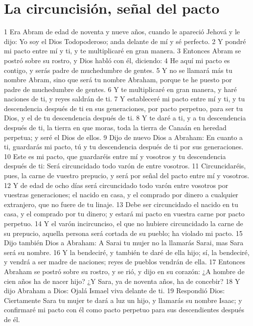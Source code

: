 \section*{La circuncisión, señal del pacto}

1 Era Abram de edad de noventa y nueve años, cuando le apareció Jehová y le dijo: Yo soy el Dios Todopoderoso; anda delante de mí y sé perfecto.
2 Y pondré mi pacto entre mí y ti, y te multiplicaré en gran manera.
3 Entonces Abram se postró sobre su rostro, y Dios habló con él, diciendo:
4 He aquí mi pacto es contigo, y serás padre de muchedumbre de gentes.
5 Y no se llamará más tu nombre Abram, sino que será tu nombre Abraham, porque te he puesto por padre de muchedumbre de gentes.
6 Y te multiplicaré en gran manera, y haré naciones de ti, y reyes saldrán de ti.
7 Y estableceré mi pacto entre mí y ti, y tu descendencia después de ti en sus generaciones, por pacto perpetuo, para ser tu Dios, y el de tu descendencia después de ti.
8 Y te daré a ti, y a tu descendencia después de ti, la tierra en que moras, toda la tierra de Canaán en heredad perpetua; y seré el Dios de ellos.
9 Dijo de nuevo Dios a Abraham: En cuanto a ti, guardarás mi pacto, tú y tu descendencia después de ti por sus generaciones.
10 Este es mi pacto, que guardaréis entre mí y vosotros y tu descendencia después de ti: Será circuncidado todo varón de entre vosotros.
11 Circuncidaréis, pues, la carne de vuestro prepucio, y será por señal del pacto entre mí y vosotros.
12 Y de edad de ocho días será circuncidado todo varón entre vosotros por vuestras generaciones; el nacido en casa, y el comprado por dinero a cualquier extranjero, que no fuere de tu linaje.
13 Debe ser circuncidado el nacido en tu casa, y el comprado por tu dinero; y estará mi pacto en vuestra carne por pacto perpetuo.
14 Y el varón incircunciso, el que no hubiere circuncidado la carne de su prepucio, aquella persona será cortada de su pueblo; ha violado mi pacto.
15 Dijo también Dios a Abraham: A Sarai tu mujer no la llamarás Sarai, mas Sara será su nombre.
16 Y la bendeciré, y también te daré de ella hijo; sí, la bendeciré, y vendrá a ser madre de naciones; reyes de pueblos vendrán de ella.
17 Entonces Abraham se postró sobre su rostro, y se rió, y dijo en su corazón: ¿A hombre de cien años ha de nacer hijo? ¿Y Sara, ya de noventa años, ha de concebir?
18 Y dijo Abraham a Dios: Ojalá Ismael viva delante de ti.
19 Respondió Dios: Ciertamente Sara tu mujer te dará a luz un hijo, y llamarás su nombre Isaac; y confirmaré mi pacto con él como pacto perpetuo para sus descendientes después de él.
